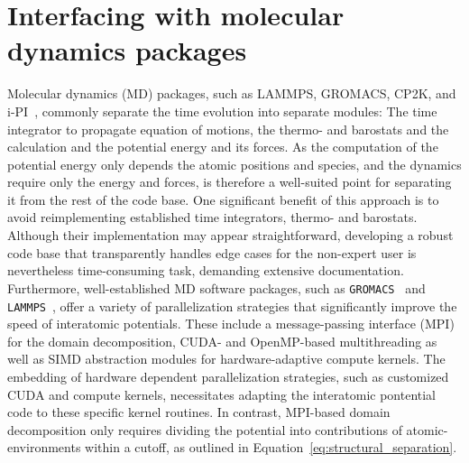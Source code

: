 \section{Interfacing with molecular dynamics packages}
Molecular dynamics (MD) packages, such as LAMMPS, GROMACS, CP2K, and i-PI~\cite{LAMMPS,hess+08jctc,kuhne2020cp2k,kapil2019pi}, commonly separate the time evolution into separate modules: The time integrator to propagate equation of motions, the thermo- and barostats and the calculation and the potential energy and its forces.
As the computation of the potential energy only depends the atomic positions and species, and the dynamics require only the energy and forces, is therefore a well-suited point for separating it from the rest of the code base.
One significant benefit of this approach is to avoid reimplementing established time integrators, thermo- and barostats.
Although their implementation may appear straightforward, developing a robust code base that transparently handles edge cases for the non-expert user is nevertheless time-consuming task, demanding extensive documentation.
Furthermore, well-established MD software packages, such as \texttt{GROMACS}~\cite{abraham2015gromacs} and \texttt{LAMMPS}~\cite{LAMMPS}, offer a variety of parallelization strategies that significantly improve the speed of interatomic potentials.
These include a message-passing interface (MPI) for the domain decomposition, CUDA- and OpenMP-based multithreading as well as SIMD abstraction modules for hardware-adaptive compute kernels.
The embedding of hardware dependent parallelization strategies, such as customized CUDA and compute kernels, necessitates adapting the interatomic pontential code to these specific kernel routines.
In contrast, MPI-based domain decomposition only requires dividing the potential into contributions of atomic-environments within a cutoff, as outlined in Equation~\eqref{eq:structural_separation}.
